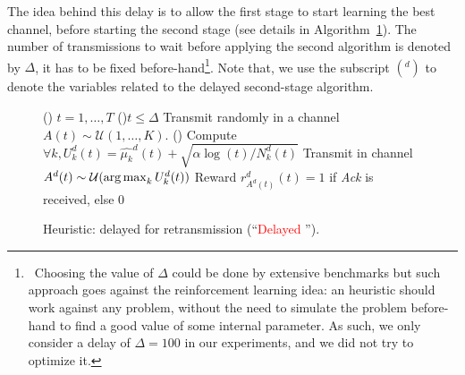 The idea behind this delay is to allow the first stage \UCB{} to start learning the best channel, before starting the second stage \UCB{} (see details in Algorithm~\ref{algo:43:UCBwithDelay}).
The number of transmissions to wait before applying the second algorithm is denoted by $\Delta$, it has to be fixed before-hand\footnote{~Choosing the value of $\Delta$ could be done by extensive benchmarks but such approach goes against the reinforcement learning idea: an heuristic should work against any problem, without the need to simulate the problem before-hand to find a good value of some internal parameter. As such, we only consider a delay of $\Delta=100$ in our experiments, and we did not try to optimize it.}.
%
Note that, we use the subscript $({}^d)$ to denote the variables
related to the delayed second-stage \UCB{} algorithm.

\begin{figure}[h!]
	\centering
	\begin{framed}
	\begin{algorithm}[H]
		\For()
		{$t = 1, \dots, T$}{
			\uElseIf(){$t \leq \Delta$}{
				Transmit randomly in a channel $A(t) \sim \mathcal{U}(1,\ldots,K)$.
			}
			\uElse(){
				Compute $\forall k, U^d_k(t) = \widehat{\mu_k}^d(t) + \sqrt{\alpha \log(t) / N_k^d(t)}$\;
				Transmit in channel $A^d(t) \sim \mathcal{U}(\operatorname*{arg\,max}_k U^d_k(t))$\;
				Reward $r^d_{A^d(t)}(t) = 1$ if \emph{Ack} is received, else $0$\;
			}
		}
		\caption[Heuristic: delayed \UCB{} for retransmission.]{Heuristic: delayed \UCB{} for retransmission (``\textcolor{red}{Delayed \UCB}'').}
		\label{algo:43:UCBwithDelay}
	\end{algorithm}
	\end{framed}
\end{figure}


